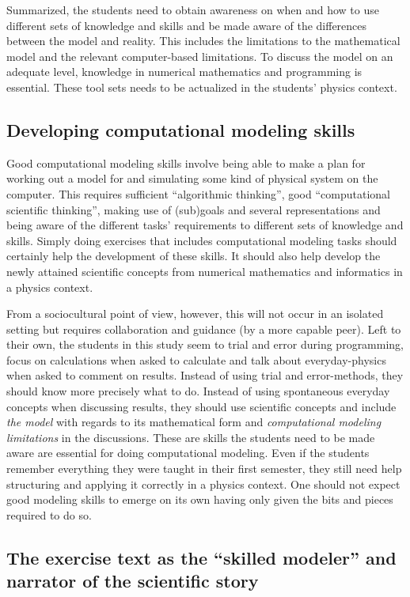 \documentclass[aps,prb,floatfix,twocolumn,twoside,english]{revtex4-1}
\begin{document}
Summarized, the students need to obtain awareness on when and how to use different sets of knowledge and skills and be made aware of the differences between the model and reality. This includes the limitations to the mathematical model and the relevant computer-based limitations. To discuss the model on an adequate level, knowledge in numerical mathematics and programming is essential. These tool sets needs to be actualized in the students' physics context.

\subsection{Developing computational modeling skills}

Good computational modeling skills involve being able to make a plan for working out a model for and simulating some kind of physical system on the computer. This requires sufficient ``algorithmic thinking'', good ``computational scientific thinking'', making use of (sub)goals and several representations and being aware of the different tasks' requirements to different sets of knowledge and skills. Simply doing exercises that includes computational modeling tasks should certainly help the development of these skills. It should also help develop the newly attained scientific concepts from numerical mathematics and informatics in a physics context. 

From a sociocultural point of view, however, this will not occur in an isolated setting but requires collaboration and guidance (by a more capable peer). Left to their own, the students in this study seem to trial and error during programming, focus on calculations when asked to calculate and talk about everyday-physics when asked to comment on results. Instead of using trial and error-methods, they should know more precisely what to do. Instead of using spontaneous everyday concepts when discussing results, they should use scientific concepts and include \textit{the model} with regards to its mathematical form and \textit{computational modeling limitations} in the discussions. These are skills the students need to be made aware are essential for doing computational modeling. Even if the students remember everything they were taught in their first semester, they still need help structuring and applying it correctly in a physics context. One should not expect good modeling skills to emerge on its own having only given the bits and pieces required to do so.


\subsection{The exercise text as the ``skilled modeler'' and narrator of the scientific story}
\end{document}
